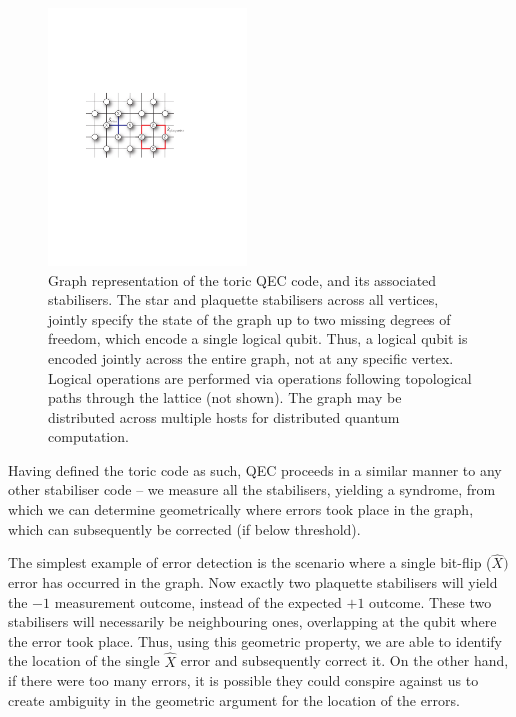 \begin{figure}[!htb]
	\includegraphics[width=0.47\textwidth]{toric_code}
	\caption{Graph representation of the toric QEC code, and its associated stabilisers. The star and plaquette stabilisers across all vertices, jointly specify the state of the graph up to two missing degrees of freedom, which encode a single logical qubit. Thus, a logical qubit is encoded jointly across the entire graph, not at any specific vertex. Logical operations are performed via operations following topological paths through the lattice (not shown). The graph may be distributed across multiple hosts for distributed quantum computation.} \label{fig:toric_code}
\end{figure}


Having defined the toric code as such, QEC proceeds in a similar manner to any other stabiliser code -- we measure all the stabilisers, yielding a syndrome, from which we can determine geometrically where errors took place in the graph, which can subsequently be corrected (if below threshold).

The simplest example of error detection is the scenario where a single bit-flip ($\hat{X})$ error has occurred in the graph. Now exactly two plaquette stabilisers will yield the $-1$ measurement outcome, instead of the expected $+1$ outcome. These two stabilisers will necessarily be neighbouring ones, overlapping at the qubit where the error took place. Thus, using this geometric property, we are able to identify the location of the single $\hat{X}$ error and subsequently correct it. On the other hand, if there were too many errors, it is possible they could conspire against us to create ambiguity in the geometric argument for the location of the errors. 

